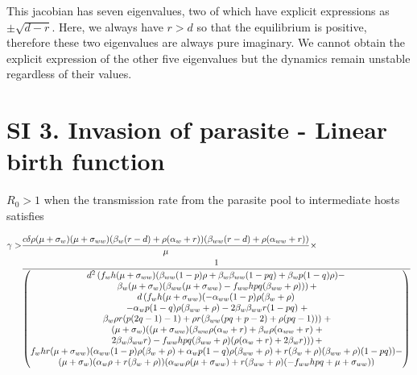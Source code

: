 \documentclass[11pt]{article}
\begin{document}
This jacobian has seven eigenvalues, two of which have explicit expressions as $\pm \sqrt{d - r}$. Here, we always have $r > d$ so that the equilibrium is positive, therefore these two eigenvalues are always pure imaginary. We cannot obtain the explicit expression of the other five eigenvalues but the dynamics remain unstable regardless of their values.

\section*{SI 3. Invasion of parasite - Linear birth function }


$R_0 > 1$ when the transmission rate from the parasite pool to intermediate hosts satisfies

\begin{align}
	\gamma > & \frac{c \delta  \rho  (\mu +\sigma_w) (\mu + \sigma_{ww}) (\beta_w (r-d)+\rho  (\alpha_w+ r)) (\beta_{ww} (r-d)+\rho  (\alpha_{ww}+r))}{\mu } \notag \times \\
	& \frac{1}{\begin{pmatrix}
			d^2 \left(f_w h (\mu  + \sigma_{ww}) (\beta_{ww} (1-p) \rho  + \beta_w \beta_{ww} (1-p q)+\beta_w p (1-q) \rho ) - \right. \\
			\left. \beta_w (\mu + \sigma_w) (\beta_{ww} (\mu +\sigma_{ww}) - f_{ww} h p q (\beta_{ww}+\rho ))\right) + \\
			d \left(f_w h (\mu +\sigma_{ww}) (- \alpha_{ww} (1-p) \rho  (\beta_w + \rho )  \right.  \\
			\left. - \alpha_w p (1 - q) \rho  (\beta_{ww}+\rho ) - 2 \beta_w \beta_{ww} r (1-p q) \right. + \\
			\left. \beta_w \rho  r (p (2 q-1)-1) + \rho  r (\beta_{ww} (p q + p-2)+\rho  (p q - 1))) \right. + \\
			\left. (\mu +\sigma_w) ((\mu +\sigma_{ww}) (\beta_{ww} \rho  (\alpha_w+r) + \beta_w \rho  (\alpha_{ww}+r) \right. + \\
			\left. 2 \beta_w \beta_{ww} r)-f_{ww} h p q (\beta_{ww}+\rho ) (\rho  (\alpha_w+r)+2 \beta_w r)) \right) + \\
			f_w h r (\mu +\sigma_{ww}) (\alpha_{ww} (1-p) \rho  (\beta_w+\rho )+\alpha_w p (1-q) \rho  (\beta_{ww}+\rho )+r (\beta_w+\rho ) (\beta_{ww}+\rho ) (1-p q)) - \\
			(\mu +\sigma_w) (\alpha_w \rho +r (\beta_w+\rho )) (\alpha_{ww} \rho  (\mu +\sigma_{ww})+r (\beta_{ww}+\rho ) (-f_{ww} h p q+\mu +\sigma_{ww}))
		\end{pmatrix}}
\end{align}
\end{document}
